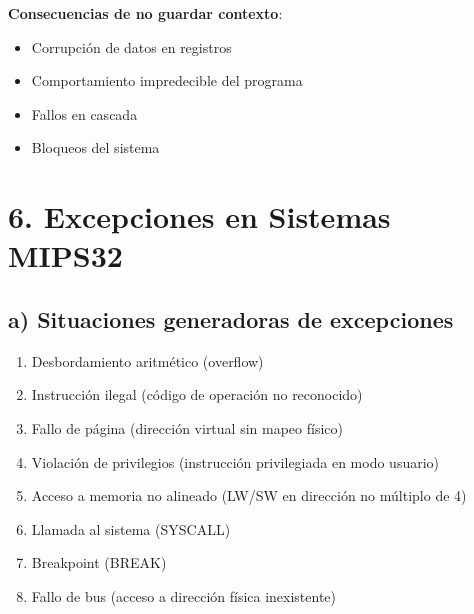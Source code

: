 \documentclass[12pt]{article}
\begin{document}
\textbf{Consecuencias de no guardar contexto}:
\begin{itemize}
    \item Corrupción de datos en registros
    \item Comportamiento impredecible del programa
    \item Fallos en cascada
    \item Bloqueos del sistema
\end{itemize}

\section*{6. Excepciones en Sistemas MIPS32}
\subsection*{a) Situaciones generadoras de excepciones}
\begin{enumerate}
    \item Desbordamiento aritmético (overflow)
    \item Instrucción ilegal (código de operación no reconocido)
    \item Fallo de página (dirección virtual sin mapeo físico)
    \item Violación de privilegios (instrucción privilegiada en modo usuario)
    \item Acceso a memoria no alineado (LW/SW en dirección no múltiplo de 4)
    \item Llamada al sistema (SYSCALL)
    \item Breakpoint (BREAK)
    \item Fallo de bus (acceso a dirección física inexistente)
\end{enumerate}
\end{document}
